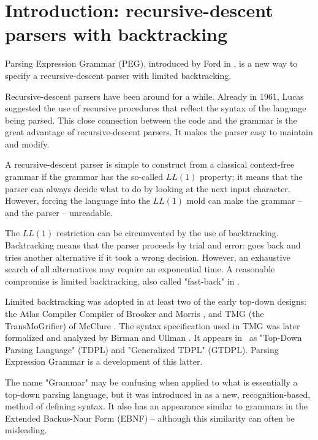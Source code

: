 
\section{Introduction: recursive-descent parsers with backtracking}


Parsing Expression Grammar (PEG),
introduced by Ford in \cite{Ford:2002,Ford:Thesis,Ford:2004},
is a new way to specify a recursive-descent parser with limited backtracking.
 
Recursive-descent parsers have been around for a while.
Already in 1961, Lucas \cite{Lucas:1961} suggested the use of recursive procedures
that reflect the syntax of the language being parsed.
This close connection between the code and the grammar
is the great advantage of recursive-descent parsers.
It makes the parser easy to maintain and modify.

A recursive-descent parser is simple to construct
from a classical context-free grammar
if the grammar has the so-called $LL(1)$ property;
it means that the parser can always decide what to do
by looking at the next input character.
However, forcing the language into the $LL(1)$ mold 
can make the grammar -- and the parser -- unreadable.

The $LL(1)$ restriction can be circumvented by the use of backtracking.
Backtracking means that the parser proceeds by trial and error:
goes back and tries another alternative if it took a wrong decision.
However, an exhaustive search
of all alternatives may require an exponential time.
A reasonable compromise is limited backtracking, 
also called "fast-back" in \cite{Hopgood:1969}.

Limited backtracking was adopted in at least two of the early top-down designs:
the Atlas Compiler Compiler 
of Brooker and Morris \cite{Brooker:Morris:1961,Rosen:1964},  
and TMG (the TransMoGrifier) of McClure \cite{McClure:1965}.
The syntax specification used in TMG was later formalized and analyzed
by Birman and Ullman \cite{Birman:1970,Birman:Ullman:1973}.
It appears in~\cite{Aho:Ullman:1972} as "Top-Down Parsing Language" (TDPL)
and "Generalized TDPL" (GTDPL).
Parsing Expression Grammar is a development of this latter.

The name "Grammar" may be confusing when applied to what 
is essentially a top-down parsing language,
but it was introduced in \cite{Ford:2004} as a new,
recognition-based, method of defining syntax.
It also has an appearance similar to grammars in the
Extended Backus-Naur Form (EBNF) --
although this similarity can often be misleading.


